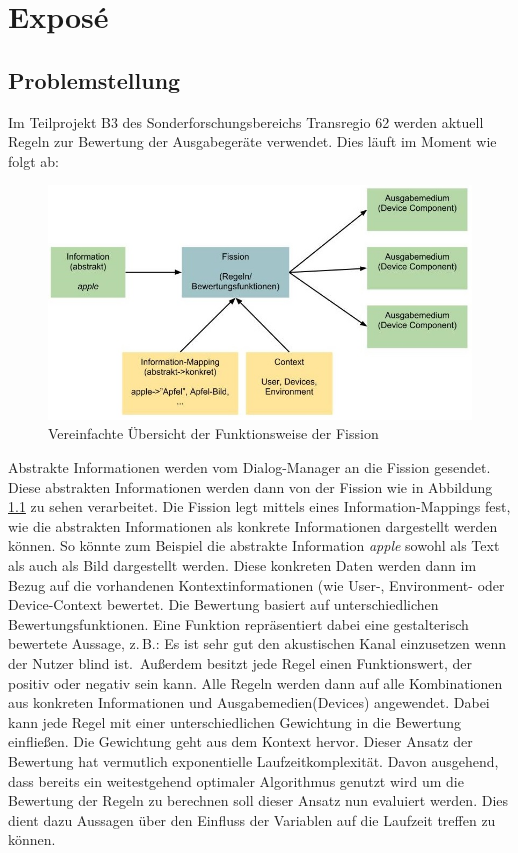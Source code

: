\setcounter{page}{0}
\vspace{-5em}
\chapter{Exposé}
\vspace{-2em}
\section{Problemstellung}
\vspace{-1em}
Im Teilprojekt B3 des Sonderforschungsbereichs Transregio 62 werden aktuell Regeln zur Bewertung der Ausgabegeräte verwendet.
Dies läuft im Moment wie folgt ab:
\begin{figure}[ht]
    \centering
    \includegraphics[width=.8\textwidth]{images/FissionUebersicht}
    \caption{\label{fission}Vereinfachte Übersicht der Funktionsweise der Fission}
\end{figure}

 Abstrakte Informationen werden vom Dialog-Manager an die Fission gesendet. Diese abstrakten Informationen werden dann von der Fission wie in Abbildung \ref{fission} zu sehen verarbeitet. Die Fission legt mittels eines Information-Mappings fest, wie die abstrakten Informationen als konkrete Informationen dargestellt werden können. So könnte zum Beispiel die abstrakte Information \emph{apple} sowohl als Text als auch als Bild dargestellt werden. Diese konkreten Daten werden dann im Bezug auf die vorhandenen Kontextinformationen (wie  User-, Environment- oder Device-Context bewertet.
Die Bewertung basiert auf unterschiedlichen Bewertungsfunktionen. Eine Funktion repräsentiert dabei eine gestalterisch bewertete Aussage, z.\,B.: \glqq Es ist sehr gut den akustischen Kanal einzusetzen wenn der Nutzer blind ist.\grqq \ Außerdem besitzt jede Regel einen Funktionswert, der positiv oder negativ sein kann. Alle Regeln werden dann auf alle Kombinationen aus konkreten Informationen und Ausgabemedien(Devices) angewendet. Dabei kann jede Regel mit einer unterschiedlichen Gewichtung in die Bewertung einfließen. Die Gewichtung geht aus dem Kontext hervor.
\linebreak
Dieser Ansatz der Bewertung hat vermutlich exponentielle Laufzeitkomplexität. Davon ausgehend, dass bereits ein weitestgehend optimaler Algorithmus genutzt wird um die Bewertung der Regeln zu berechnen soll dieser Ansatz nun evaluiert werden. Dies dient dazu Aussagen über den Einfluss der Variablen auf die Laufzeit treffen zu können. 


